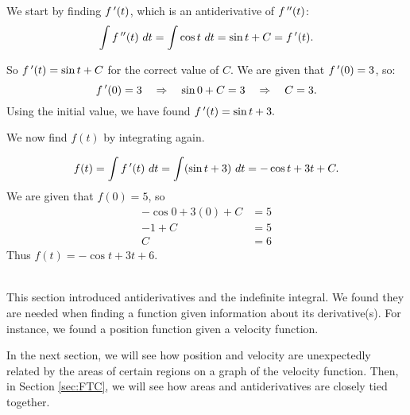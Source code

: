 {We start by finding $f\,'(t)$, which is an antiderivative of $f\,''(t)$:
		$$\int f\,''(t)\ dt = \int \cos t\ dt = \sin t + C = f\,'(t).$$
		
		So $f\,'(t) = \sin t+C$ for the correct value of $C$. We are given that $f\,'(0) = 3$, so:
		$$f\,'(0) = 3 \quad \Rightarrow \quad \sin 0+C = 3 \quad \Rightarrow \quad C=3.$$
		Using the initial value, we have found $f\,'(t) = \sin t+ 3.$
		
We now find $f(t)$ by integrating again.

$$f(t)=\int \fp(t) \ dt = \int (\sin t+3)\ dt = -\cos t + 3t + C.$$ 
We are given that $f(0) = 5$, so
\begin{align*}
-\cos 0 + 3(0) + C &= 5 \\
-1 + C &= 5\\
C &= 6
\end{align*}
 Thus $f(t) = -\cos t + 3t + 6$.
}\\

This section introduced antiderivatives and the indefinite integral. We found they are needed when finding a function given information about its derivative(s). For instance, we found a position function given a velocity function.

In the next section, we will see how position and velocity are unexpectedly related by the areas of certain regions on a graph of the velocity function. Then, in Section \ref{sec:FTC}, we will see how areas and antiderivatives are closely tied together.

